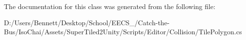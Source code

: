 The documentation for this class was generated from the following file\+:\begin{DoxyCompactItemize}
\item 
D\+:/\+Users/\+Bennett/\+Desktop/\+School/\+E\+E\+C\+S\+\_/\+Catch-\/the-\/\+Bus/\+Iso\+Chai/\+Assets/\+Super\+Tiled2\+Unity/\+Scripts/\+Editor/\+Collision/Tile\+Polygon.\+cs\end{DoxyCompactItemize}
